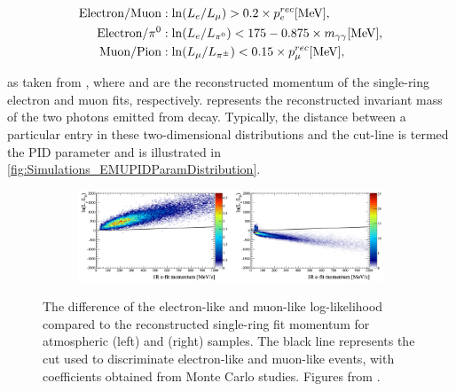 \begin{align}
  \begin{split}
    \text{Electron/Muon} &: \ln(L_{e}/L_{\mu}) > 0.2 \times p_{e}^{rec} [\text{MeV}], \\
    \text{Electron/$\pi^{0}$} &: \ln(L_{e}/L_{\pi^{0}}) < 175 - 0.875 \times m_{\gamma\gamma} [\text{MeV}], \\
    \text{Muon/Pion} &: \ln(L_{\mu}/L_{\pi^{\pm}}) < 0.15 \times p_{\mu}^{rec} [\text{MeV}], \\
  \end{split}
\end{align}

as taken from \cite{t2k_tn_319}, where  and  are the reconstructed momentum of the single-ring electron and muon fits, respectively.  represents the reconstructed invariant mass of the two photons emitted from  decay. Typically, the distance between a particular entry in these two-dimensional distributions and the cut-line is termed the PID parameter and is illustrated in \autoref{fig:Simulations_EMUPIDParamDistribution}.

\begin{figure}[h]
  \begin{subfigure}[t]{1.1\textwidth}
    \includegraphics[width=\textwidth, trim={0mm 0mm 0mm 0mm}, clip, page=1]{Figures/Simulations/LogLikelihoodDiscriminator.pdf}
  \end{subfigure}
  \caption{The difference of the electron-like and muon-like log-likelihood compared to the reconstructed single-ring fit momentum for atmospheric  (left) and \quickmath{\nu_{\mu}} (right) samples. The black line represents the cut used to discriminate electron-like and muon-like events, with coefficients obtained from Monte Carlo studies. Figures from \cite{t2k_tn_146}.}
  \label{fig:Simulations_LLHDiscriminator}
\end{figure}

